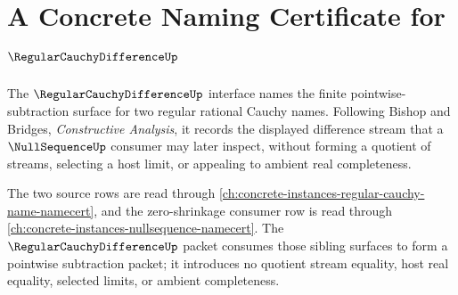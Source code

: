 \chapter{A Concrete Naming Certificate for $\RegularCauchyDifferenceUp$}
\label{ch:concrete-instances-regularcauchydifference-namecert}

The $\RegularCauchyDifferenceUp$ interface names the finite pointwise-subtraction surface for two regular rational Cauchy names. Following Bishop and Bridges, \emph{Constructive Analysis}, it records the displayed difference stream that a $\NullSequenceUp$ consumer may later inspect, without forming a quotient of streams, selecting a host limit, or appealing to ambient real completeness.

The two source rows are read through \autoref{ch:concrete-instances-regular-cauchy-name-namecert}, and the zero-shrinkage consumer row is read through \autoref{ch:concrete-instances-nullsequence-namecert}. The $\RegularCauchyDifferenceUp$ packet consumes those sibling surfaces to form a pointwise subtraction packet; it introduces no quotient stream equality, host real equality, selected limits, or ambient completeness.

